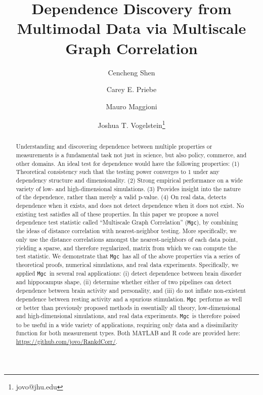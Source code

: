 \documentclass[11pt]{article}
\newcommand{\note}[2][]{\added[#1,remark={#2}]{}}
\providecommand{\sct}[1]{{\sc \texttt{#1}}}
\newcommand{\Mgc}{\sct{Mgc}}
\newcommand{\website}{\url{https://github.com/jovo/RankdCorr/}}
\newcommand{\jv}[1]{{\note{jv: #1}}}
\begin{document}
\def\spacingset#1{\renewcommand{\baselinestretch}%
{#1}\small\normalsize} \spacingset{1}

\title{\bf Dependence Discovery from Multimodal Data via  Multiscale Graph Correlation}
\author[1]{Cencheng Shen} %
\author[2]{Carey E. Priebe}%
\author[3]{Mauro Maggioni}%
\author[4]{Joshua T. Vogelstein\thanks{jovo@jhu.edu}}
\maketitle
\pagestyle{empty}

\begin{abstract}
Understanding and discovering dependence between multiple properties or measurements is a fundamental task not just in science, but also policy, commerce, and other domains.
An ideal test for dependence would have the following properties:
(1) Theoretical consistency such that the testing power converges to $1$ under any dependency structure and dimensionality.
(2) Strong empirical performance on a wide variety of low- and high-dimensional simulations.
(3) Provides insight into the nature of the dependence, rather than merely a valid p-value.
(4) On real data, detects dependence when it exists, and does not detect dependence when it does not exist.
No existing test satisfies all of these properties.
In this paper we propose a novel dependence test statistic called ``Multiscale Graph Correlation'' (\Mgc), by combining the ideas of distance correlation with nearest-neighbor testing.
More specifically, we only use the distance correlations amongst the nearest-neighbors of each data point, yielding a sparse, and therefore regularized, matrix from which we can compute the test statistic.
We demonstrate that \Mgc~has all of the above properties via a series of theoretical proofs, numerical simulations, and real data experiments.  Specifically, we applied \Mgc~in several real applications: (i) detect dependence between brain disorder and hippocampus shape, (ii) determine whether either of two pipelines can detect dependence between brain activity and personality, and (iii) do not inflate non-existent dependence between resting activity and a spurious stimulation.  \Mgc~performs as well or better than previously proposed methods in essentially all theory, low-dimensional and high-dimensional simulations, and real data experiments.  \Mgc~is therefore poised to be useful in a wide variety of applications, requiring only data and a dissimilarity function for both measurement types.  Both MATLAB and R code are provided here: \website.
\end{abstract}
\jv{in above abstract application (iii), you write "`failing to detect"', I reworded it, as "`failing"' sounds as a negative word to me. delete this comment if you are ok with it}
\end{document}
